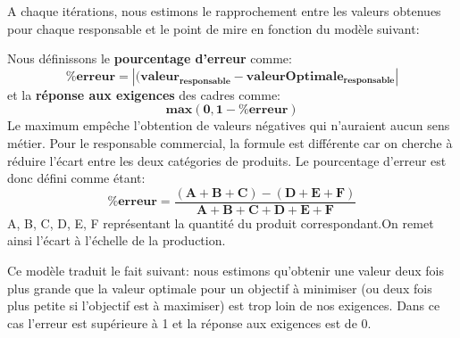 \documentclass[12pt]{article}
\begin{document}
A chaque itérations, nous estimons le rapprochement entre les valeurs obtenues pour chaque responsable et le point de mire en fonction du modèle suivant:
 
Nous définissons le \textbf{pourcentage d'erreur} comme:
	\begin{equation*}
		\boldsymbol{\%erreur=|(valeur_{responsable}-valeur Optimale_{responsable}|}
	\end{equation*}
et la \textbf{réponse aux exigences} des cadres comme:
	\begin{equation*}
		\boldsymbol{max(0, 1-\%erreur)}
	\end{equation*}
Le maximum empêche l’obtention de valeurs négatives qui n’auraient aucun sens métier.
Pour le responsable commercial, la formule est différente car on cherche à réduire l’écart entre les deux catégories de produits. 
Le pourcentage d’erreur est donc défini comme étant:
\begin{equation*}
		\boldsymbol{\%erreur=\frac{(A+B+C)-(D+E+F)}{A+B+C+D+E+F}}
	\end{equation*}
A, B, C, D, E, F représentant la quantité du produit correspondant.On remet ainsi l'écart à l'échelle de la production.

\noindent Ce modèle traduit le fait suivant: nous estimons qu'obtenir une valeur deux fois plus grande que la valeur optimale pour un objectif à minimiser (ou deux fois plus petite si l'objectif est à maximiser) est trop loin de nos exigences. Dans ce cas l'erreur est supérieure à 1 et la réponse aux exigences est de 0.
\end{document}
